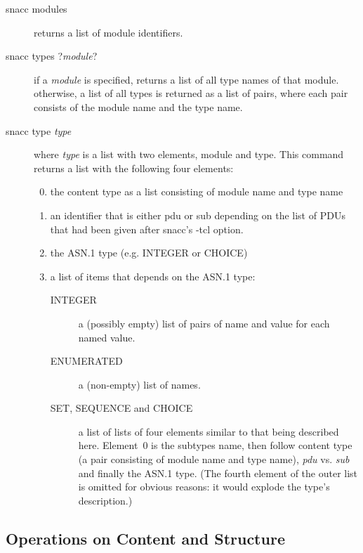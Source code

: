 \begin{description}%
  \item[{\Tcl snacc modules}]
    returns a list of module identifiers.
  \item[{\Tcl snacc types ?\emph{module}?}]
    if a \emph{module} is specified, returns a list of all type names of that module.
    otherwise, a list of all types is returned as a list of pairs, where each pair consists of the module name and the type name.
  \item[{\Tcl snacc type \emph{type}}]
    where \emph{type} is a list with two elements, module and type.
    This command returns a list with the following four elements:
    \begin{enumerate}%
    \setcounter{enumi}{-1}
      \item the content type as a list consisting of module name and type name
      \item an identifier that is either {\Tcl pdu} or {\Tcl sub} depending on the list of PDUs that had been given after snacc's {\ufn -tcl} option.
      \item the ASN.1 type (e.g. INTEGER or CHOICE)
      \item a list of items that depends on the ASN.1 type:
      \begin{description}%
	\item[INTEGER] a (possibly empty) list of pairs of name and value for each named value.
	\item[ENUMERATED] a (non-empty) list of names.
	\item[SET, SEQUENCE \textnormal{and} CHOICE] a list of lists of four elements similar to that being described here.
	  Element~0 is the subtypes name, then follow content type (a pair consisting of module name and type name), \emph{pdu} vs. \emph{sub} and finally the ASN.1 type.
	  (The fourth element of the outer list is omitted for obvious reasons: it would explode the type's description.)
      \end{description}%
    \end{enumerate}%
\end{description}%

\subsection{Operations on Content and Structure}

